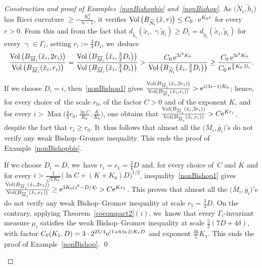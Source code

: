 \documentclass[10pt,a4paper]{amsart}
\numberwithin{equation}{section}
\newcommand{\Vol}{\operatorname{Vol}}
\newcommand{\Max}{\operatorname{Max}}
\newcommand{\g}{\operatorname{\gamma}}
\begin{document}
\begin{proof}[Construction and proof of Examples~\ref{nonBishopbis} and~\ref{nonBishop}]
As $\big(\widetilde N_i, \tilde h_i\big)$ has Ricci curvature $ \ge - \frac{K_0^2}{n-1}$, it verifies $\Vol \big( B_{\widetilde N_i} (\tilde x,r)\big) \le C_0\cdot {\rm e}^{K_0 r}$ for every
$r > 0$. From this and from the fact that $d_{\tilde h_i} (\tilde x_i, \g \tilde y_i) \ge D_i = d_{\tilde h_i} (\tilde x_i, \tilde y_i)$ for every $\g \in \Gamma_i$, setting $r_i := \frac{3}{4} D_i $, we~deduce
\begin{gather}\label{nonBishop1}
\dfrac{\Vol\big(B_{\overline M_i}(\tilde x_i,2 r_i)\big)}{\Vol \big(B_{\overline M_i}(\tilde x_i,r_i)\big)} = \dfrac{\Vol \big(B_{\overline M_i} \big(\tilde x_i,\frac{3}{2} D_i\big)\big)} {\Vol\big(B_{\overline M_i} \big(\tilde x_i,\frac{3}{4} D_i\big)\big)}
> \dfrac{C_0 \,{\rm e}^{3i^2 K_0}}{\Vol \big(B_{\widetilde N_i} \big(\tilde x_i,\frac{3}{4} D_i\big) \big)} \ge \dfrac{C_0 \,{\rm e}^{3 i^2 K_0}}{C_0 \,{\rm e}^{\frac{3}{4} K_0 \, D_i }}.
\end{gather}

\begin{itemize}\itemsep=0pt
{\sloppy\item
If we choose $D_i =i$, then~\eqref{nonBishop1} gives $\frac{\Vol
(B_{\overline M_i} (\tilde x_i,2 r_i))}{\Vol (B_{\overline M_i}
(\tilde x_i, r_i))} > {\rm e}^{i (3 i-1) K_0}$; hence, for every choice of~the scale $r_0$, of the factor $C> 0$ and of the exponent $K$, and for every
$i > \Max \big(\frac{4}{3} r_0, \frac{\ln C}{K_0}, \frac{K}{K_0}\big)$, one obtains
that $\frac{\Vol ( B_{\overline M_i} (\tilde x_i,2 r_i))}{\Vol (B_{\overline M_i} (\tilde x_i, r_i))} > C {\rm e}^{K r_i}$, despite the fact that $r_i \ge r_0$. It~thus follows that almost all the $\big(\overline M_i, \bar g_i\big)$'s do not verify any weak Bishop--Gromov inequality.
This ends the proof of Example~\ref{nonBishopbis}.

}

\item
If we choose $D_i = D$, we~have $r_i = r_1 = \frac{3}{4} D$ and, for every choice of~$C$ and $K$ and for every
$i > \frac{1}{\sqrt{3 \,K_0}}\big(\ln C + (K + K_0) D \big)^{1/2}$, inequality~\eqref{nonBishop1} gives
$\frac{\Vol(B_{\overline M_i} (\tilde x_i,2 r_1))}{\Vol(B_{\overline M_i} (\tilde x_i, r_1))} \ge {\rm e}^{3 K_0 (i^2 - D/4)} > C{\rm e}^{K r_1}$.
This proves that almost all the $\big(\overline M_i, \bar g_i\big)$'s do not verify any weak Bishop--Gromov inequality at scale $ r_1 =\frac{3}{4} D$.
On the contrary, applying Theorem~\ref{cocompact2}$(i)$, we~know that every $\Gamma_i$-invariant measure $\mu_i$ satisfies the
weak Bishop--Gromov inequality at scale \mbox{$\frac{5}{2} (7 D + 4 \delta)$}, with factor $ C_0 (K_1, D) = 3\cdot 2^{25/4} {\rm e}^{(1+ 6 \ln 2) K_1 D}$ and
exponent $\frac{36}{5} K_1$. This ends the proof of Example~\ref{nonBishop}.
\hfill \qed
\end{itemize}\renewcommand{\qed}{}
\end{proof}
\end{document}
